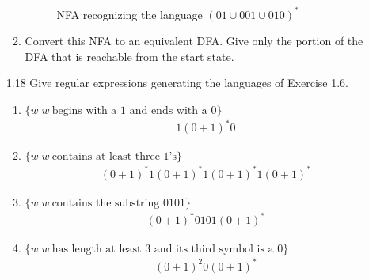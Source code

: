 \begin{enumerate}
\begin{enumerate}
\begin{figure}[H]
                        \caption{NFA recognizing the language $(01 \cup 001 \cup 010)^\ast$}
                    \end{figure}
              \item Convert this NFA to an equivalent DFA. Give only the portion of the DFA that is reachable from the start state.
          \end{enumerate}
    \item [1.18]
          Give regular expressions generating the languages of Exercise 1.6.
          \begin{enumerate}
              \item $\{w|w~ \text{begins with a }1\text{ and ends with a }0\}$
                    \begin{align*}
                        1(0+1)^*0
                    \end{align*}
              \item $\{w|w~ \text{contains at least three }1\text{'s}\}$
                    \begin{align*}
                        (0+1)^*1(0+1)^*1(0+1)^*1(0+1)^*
                    \end{align*}
              \item $\{w|w~ \text{contains the substring }0101\}$
                    \begin{align*}
                        (0+1)^*0101(0+1)^*
                    \end{align*}
              \item $\{w|w~ \text{has length at least }3\text{ and its third symbol is a }0\}$
                    \begin{align*}
                        (0+1)^{2}0(0+1)^*

\end{align*}
\end{enumerate}
\end{enumerate}
